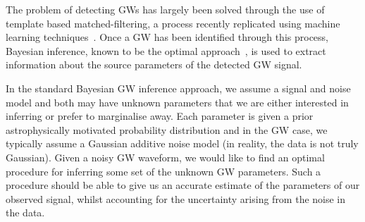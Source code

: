 \documentclass[%
showpacs,
 amsmath,amssymb,
 aps,
 twocolumn,
 prl,
 reprint,
floatfix,
]{revtex4-1}
\begin{document}
%
%
%

%
%
The problem of detecting \acp{GW} has largely been solved through the use of
template based matched-filtering, a process recently replicated using machine
learning techniques~\cite{GEORGE201864,PhysRevLett.120.141103,GebKilParHarSch}.
Once a \ac{GW} has been identified through this process, Bayesian inference,
known to be the optimal approach~\cite{2009CQGra..26o5017S}, is used to extract
information about the source parameters of the detected \ac{GW} signal.

%
%
In the standard Bayesian \ac{GW} inference approach, we assume a signal and
noise model and both may have unknown parameters that we are either interested
in inferring or prefer to marginalise away. Each parameter is given a prior
astrophysically motivated probability distribution and in the \ac{GW} case, we
typically assume a Gaussian additive noise model (in reality, the data is not
truly Gaussian). Given a noisy \ac{GW} waveform, we would like to find an
optimal procedure for inferring some set of the unknown \ac{GW} parameters.
Such a procedure should be able to give us an accurate estimate of the
parameters of our observed signal, whilst accounting for the uncertainty
arising from the noise in the data.
\end{document}
